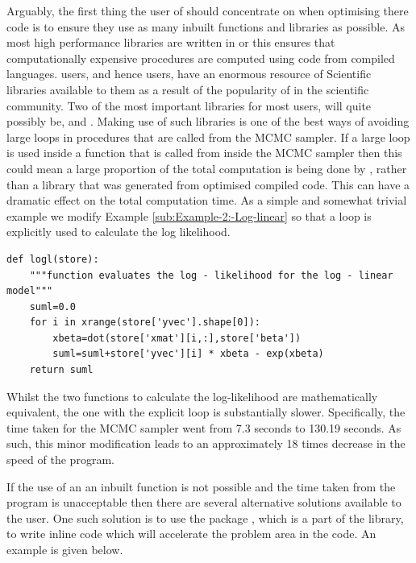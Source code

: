 \documentclass[article]{jss}
\begin{document}
Arguably, the first thing the user of  should concentrate
on when optimising there  code is to ensure they use as
many inbuilt functions and libraries as possible. As most high
performance libraries are written in  or
 this ensures that computationally expensive
procedures are computed using code from compiled languages.
 users, and hence  users, have an
enormous resource of Scientific libraries available to them as a
result of the popularity of  in the scientific
community. Two of the most important libraries for most users, will
quite possibly be,  and . Making use of such
libraries is one of the best ways of avoiding large loops in
procedures that are called from the MCMC sampler. If a large loop is
used inside a function that is called from inside the MCMC sampler
then this could mean a large proportion of the total computation is
being done by , rather than a library that was
generated from optimised compiled code. This can have a dramatic
effect on the total computation time. As a simple and somewhat trivial
example we modify Example \ref{sub:Example-2:-Log-linear} so that a
loop is explicitly used to calculate the log likelihood.




\begin{lstlisting}[basicstyle={\scriptsize}]
def logl(store):
    """function evaluates the log - likelihood for the log - linear model"""
    suml=0.0
    for i in xrange(store['yvec'].shape[0]):
        xbeta=dot(store['xmat'][i,:],store['beta'])
        suml=suml+store['yvec'][i] * xbeta - exp(xbeta)
    return suml
\end{lstlisting}


Whilst the two functions to calculate the log-likelihood are
mathematically equivalent, the one with the explicit loop is
substantially slower.  Specifically, the time taken for the MCMC
sampler went from 7.3 seconds to 130.19 seconds. As such, this minor
modification leads to an approximately 18 times decrease in the speed
of the program.

If the use of an an inbuilt function is not possible and the time
taken from the program is unacceptable then there are several
alternative solutions available to the user. One such solution is to
use the package , which is a part of the 
library, to write inline  code which will accelerate the
problem area in the code. An example is given below.
\end{document}
